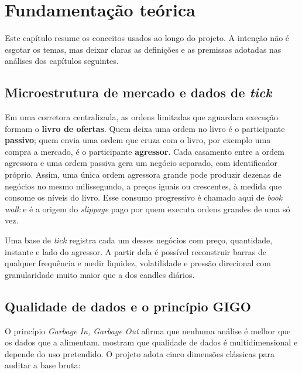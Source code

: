 \chapter{Fundamentação teórica}\label{cap:fundamentacao}

Este capítulo resume os conceitos usados ao longo do projeto. A intenção não é
esgotar os temas, mas deixar claras as definições e as premissas adotadas nas
análises dos capítulos seguintes.

\section{Microestrutura de mercado e dados de \textit{tick}}\label{sec:microestrutura}

Em uma corretora centralizada, as ordens limitadas que aguardam execução formam
o \textbf{livro de ofertas}. Quem deixa uma ordem no livro é o participante
\textbf{passivo}; quem envia uma ordem que cruza com o livro, por exemplo uma
compra a mercado, é o participante \textbf{agressor}. Cada casamento entre a
ordem agressora e uma ordem passiva gera um negócio separado, com identificador
próprio. Assim, uma única ordem agressora grande pode produzir dezenas de
negócios no mesmo milissegundo, a preços iguais ou crescentes, à medida que
consome os níveis do livro. Esse consumo progressivo é chamado aqui de
\textit{book walk} e é a origem do \textit{slippage} pago por quem executa
ordens grandes de uma só vez.

Uma base de \textit{tick} registra cada um desses negócios com preço,
quantidade, instante e lado do agressor. A partir dela é possível reconstruir
barras de qualquer frequência e medir liquidez, volatilidade e pressão
direcional com granularidade muito maior que a dos candles diários.

\section{Qualidade de dados e o princípio GIGO}\label{sec:qualidade}

O princípio \textit{Garbage In, Garbage Out} afirma que nenhuma análise é
melhor que os dados que a alimentam.  mostram que
qualidade de dados é multidimensional e depende do uso pretendido. O projeto
adota cinco dimensões clássicas para auditar a base bruta:

